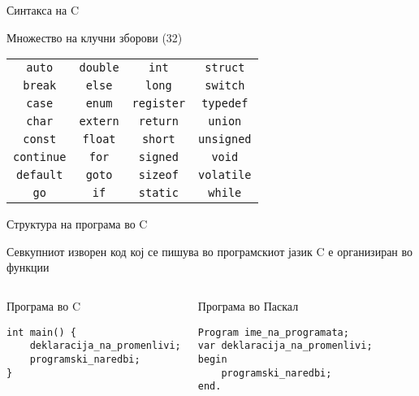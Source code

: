 \begin{frame}{Синтакса на C}

    \begin{block}{Множество на клучни зборови (32)}

    \begin{tabular}{c c c c}
        \texttt{auto} & \texttt{double} & \texttt{int} & \texttt{struct} \\
        \texttt{break} & \texttt{else} & \texttt{long} & \texttt{switch} \\
        \texttt{case} & \texttt{enum} & \texttt{register} & \texttt{typedef} \\
        \texttt{char} & \texttt{extern} & \texttt{return} & \texttt{union} \\
        \texttt{const} & \texttt{float} & \texttt{short} & \texttt{unsigned} \\
        \texttt{continue} & \texttt{for} & \texttt{signed} & \texttt{void} \\
        \texttt{default} & \texttt{goto} & \texttt{sizeof} & \texttt{volatile} \\
        \texttt{go} & \texttt{if} & \texttt{static} & \texttt{while}
    \end{tabular}
    \end{block}
\end{frame}

\begin{frame}[fragile]{Структура на програма во C}

    Севкупниот изворен код кој се пишува во програмскиот јазик C е организиран во функции
    \linebreak
    
\begin{columns}[t]
\begin{block}{Програма во C}
\begin{lstlisting}
int main() {
    deklaracija_na_promenlivi;
    programski_naredbi;
}
\end{lstlisting}
\end{block}
\begin{block}{Програма во Паскал}
\begin{lstlisting}
Program ime_na_programata;
var deklaracija_na_promenlivi;
begin
    programski_naredbi;
end.
\end{lstlisting}
\end{block}
\end{columns}

\end{frame}

